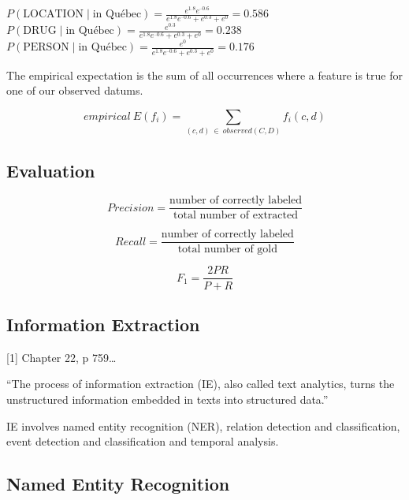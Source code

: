 $P(\text{LOCATION} \mid \text{in Québec}) = \frac{e^{1.8} e^{–0.6}}{e^{1.8} e^{–0.6} + e^{0.3} + e^0} = 0.586$\\
$P(\text{DRUG} \mid \text{in Québec}) = \frac{e^{0.3}}{e^{1.8} e^{–0.6} + e^{0.3} + e^0} = 0.238$\\
$P(\text{PERSON} \mid \text{in Québec}) = \frac{e^0}{e^{1.8} e^{–0.6} + e^{0.3} + e^0} = 0.176$

The empirical expectation is the sum of all occurrences where a feature is true for one of our observed datums.

\begin{equation}
  empirical \ E(f_i)= \sum_{(c,d) \ \in \ observed(C,D)}f_i(c,d)
  \label{eq:epirical}
\end{equation}


\subsection*{Evaluation}

\begin{equation}
  Precision = \frac{\text{number of correctly labeled}}{\text{total number of extracted}}
  \label{eq:preci}
\end{equation}

\begin{equation}
  Recall = \frac{\text{number of correctly labeled}}{\text{total number of gold}}
  \label{eq:reca}
\end{equation}

\begin{equation}
  F_1 = \frac{2PR}{P+R}
  \label{eq:f1mes}
\end{equation}


\subsection*{Information Extraction}

[1] Chapter 22, p 759…

``The process of information extraction (IE), also called text analytics, turns the unstructured information embedded in texts into structured data.''

IE involves named entity recognition (NER), relation detection and classification, event detection and classification and temporal analysis.


\subsection*{Named Entity Recognition}

